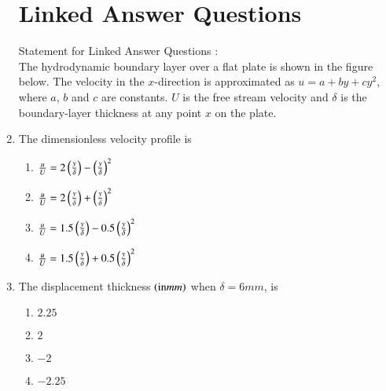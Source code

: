 \documentclass[journal]{IEEEtran}
\begin{document}
\begin{enumerate}[start=19]
\section*{Linked Answer Questions}
Statement for Linked Answer Questions :\\
The hydrodynamic boundary layer over a flat plate is shown in the figure below. The velocity in the $x$-direction is approximated as $u = a + by + cy^2$, where $a$, $b$ and $c$ are constants. $U$ is the free stream velocity and $\delta$ is the boundary-layer thickness at any point $x$ on the plate.
\item The dimensionless velocity profile is
\begin{enumerate}
    \item $\frac{u}{U} = 2\left(\frac{y}{\delta}\right)-\left(\frac{y}{\delta}\right)^2$       
    \item $\frac{u}{U} = 2\left(\frac{y}{\delta}\right)+\left(\frac{y}{\delta}\right)^2$        
    \item $\frac{u}{U} = 1.5\left(\frac{y}{\delta}\right)-0.5\left(\frac{y}{\delta}\right)^2$        
    \item $\frac{u}{U} = 1.5\left(\frac{y}{\delta}\right)+0.5\left(\frac{y}{\delta}\right)^2$
\end{enumerate}
\item The displacement thickness $\left(\text{in} mm\right)$ when $\delta = 6 mm$, is
\begin{enumerate}
    \item $2.25$
    \item $2$
    \item $-2$
    \item $-2.25$
\end{enumerate}
\end{enumerate}
\end{document}
